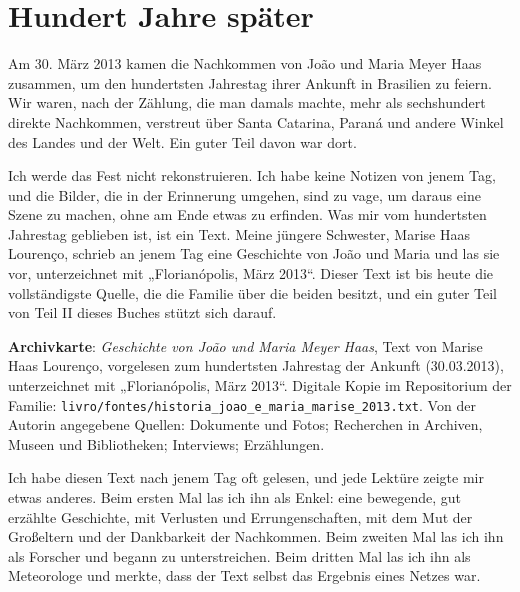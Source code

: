 \documentclass[
  ngerman,
  11pt,
  openany]{book}
\begin{document}
\section{Hundert Jahre später}\label{hundert-jahre-spuxe4ter}

Am 30. März 2013 kamen die Nachkommen von João und Maria Meyer Haas
zusammen, um den hundertsten Jahrestag ihrer Ankunft in Brasilien zu
feiern. Wir waren, nach der Zählung, die man damals machte, mehr als
sechshundert direkte Nachkommen, verstreut über Santa Catarina, Paraná
und andere Winkel des Landes und der Welt. Ein guter Teil davon war
dort.

Ich werde das Fest nicht rekonstruieren. Ich habe keine Notizen von
jenem Tag, und die Bilder, die in der Erinnerung umgehen, sind zu vage,
um daraus eine Szene zu machen, ohne am Ende etwas zu erfinden. Was mir
vom hundertsten Jahrestag geblieben ist, ist ein Text. Meine jüngere
Schwester, Marise Haas Lourenço, schrieb an jenem Tag eine Geschichte
von João und Maria und las sie vor, unterzeichnet mit „Florianópolis,
März 2013``. Dieser Text ist bis heute die vollständigste Quelle, die
die Familie über die beiden besitzt, und ein guter Teil von Teil II
dieses Buches stützt sich darauf.

\begin{ficha}

\textbf{Archivkarte}: \emph{Geschichte von João und Maria Meyer Haas},
Text von Marise Haas Lourenço, vorgelesen zum hundertsten Jahrestag der
Ankunft (30.03.2013), unterzeichnet mit „Florianópolis, März 2013``.
Digitale Kopie im Repositorium der Familie:
\texttt{livro/fontes/historia\_joao\_e\_maria\_marise\_2013.txt}. Von
der Autorin angegebene Quellen: Dokumente und Fotos; Recherchen in
Archiven, Museen und Bibliotheken; Interviews; Erzählungen.

\end{ficha}

Ich habe diesen Text nach jenem Tag oft gelesen, und jede Lektüre zeigte
mir etwas anderes. Beim ersten Mal las ich ihn als Enkel: eine
bewegende, gut erzählte Geschichte, mit Verlusten und Errungenschaften,
mit dem Mut der Großeltern und der Dankbarkeit der Nachkommen. Beim
zweiten Mal las ich ihn als Forscher und begann zu unterstreichen. Beim
dritten Mal las ich ihn als Meteorologe und merkte, dass der Text selbst
das Ergebnis eines Netzes war.
\end{document}
